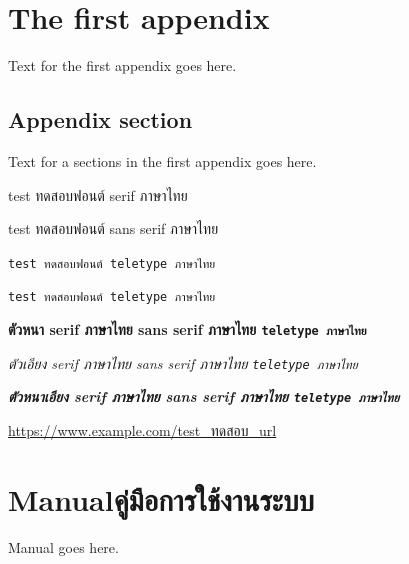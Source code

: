 \chapter{The first appendix}

Text for the first appendix goes here.

\section{Appendix section}

Text for a sections in the first appendix goes here.

test ทดสอบฟอนต์ serif ภาษาไทย

\textsf{test ทดสอบฟอนต์ sans serif ภาษาไทย}

\verb+test ทดสอบฟอนต์ teletype ภาษาไทย+

\texttt{test ทดสอบฟอนต์ teletype ภาษาไทย}

\textbf{ตัวหนา serif ภาษาไทย \textsf{sans serif ภาษาไทย} \texttt{teletype ภาษาไทย}}

\textit{ตัวเอียง serif ภาษาไทย \textsf{sans serif ภาษาไทย} \texttt{teletype ภาษาไทย}}

\textbf{\textit{ตัวหนาเอียง serif ภาษาไทย \textsf{sans serif ภาษาไทย} \texttt{teletype ภาษาไทย}}}

\url{https://www.example.com/test_ทดสอบ_url}

\chapter{\ifenglish Manual\else คู่มือการใช้งานระบบ\fi}

Manual goes here.
